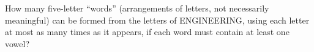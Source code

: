 How many five-letter ``words'' (arrangements of letters, not necessarily meaningful) can be formed from the letters of ENGINEERING, using each letter at most as many times as it appears, if each word must contain at least one vowel?
